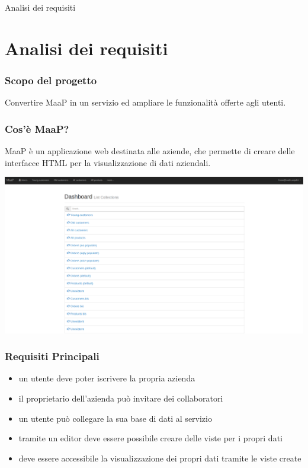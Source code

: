 \begin{frame}

\begin{center}
    \huge Analisi dei requisiti
\end{center}

\end{frame}

\section{Analisi dei requisiti}
\begin{frame}
  \frametitle{Scopo del progetto}

  \begin{center}
    Convertire MaaP in un servizio ed ampliare le funzionalità offerte agli utenti.
  \end{center}
\end{frame}

\begin{frame}
  \frametitle{Cos'è MaaP?}

  MaaP è un applicazione web destinata alle aziende, che permette di creare delle interfacce HTML per la visualizzazione di dati aziendali.

   \includegraphics[width=0.6\columnwidth]{res/img/HomeMaap.png}
  
\end{frame}

\begin{frame}
  \frametitle{Requisiti Principali}

  \begin{itemize}
  \item un utente deve poter iscrivere la propria azienda
  \item il proprietario dell'azienda può invitare dei collaboratori
  \item un utente può collegare la sua base di dati al servizio
  \item tramite un editor deve essere possibile creare delle viste per i propri dati
  \item deve essere accessibile la visualizzazione dei propri dati tramite le viste create
  \end{itemize}
\end{frame}


